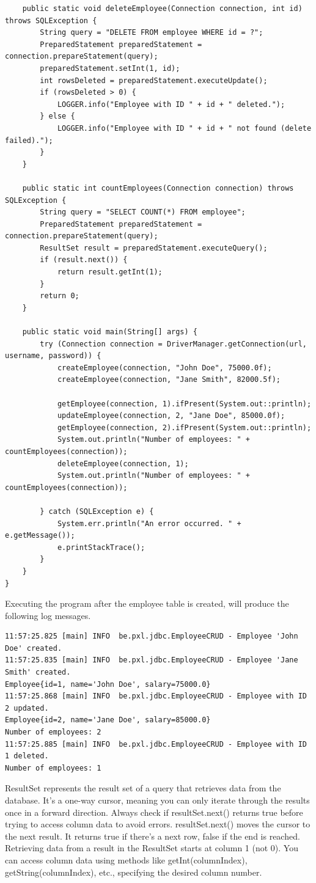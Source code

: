 \begin{lstlisting}
	public static void deleteEmployee(Connection connection, int id) throws SQLException {
		String query = "DELETE FROM employee WHERE id = ?";
		PreparedStatement preparedStatement = connection.prepareStatement(query);
		preparedStatement.setInt(1, id);
		int rowsDeleted = preparedStatement.executeUpdate();
		if (rowsDeleted > 0) {
			LOGGER.info("Employee with ID " + id + " deleted.");
		} else {
			LOGGER.info("Employee with ID " + id + " not found (delete failed).");
		}
	}

	public static int countEmployees(Connection connection) throws SQLException {
		String query = "SELECT COUNT(*) FROM employee";
		PreparedStatement preparedStatement = connection.prepareStatement(query);
		ResultSet result = preparedStatement.executeQuery();
		if (result.next()) {
			return result.getInt(1);
		}
		return 0;
	}

	public static void main(String[] args) {
		try (Connection connection = DriverManager.getConnection(url, username, password)) {
			createEmployee(connection, "John Doe", 75000.0f);
			createEmployee(connection, "Jane Smith", 82000.5f);

			getEmployee(connection, 1).ifPresent(System.out::println);
			updateEmployee(connection, 2, "Jane Doe", 85000.0f);
			getEmployee(connection, 2).ifPresent(System.out::println);
			System.out.println("Number of employees: " + countEmployees(connection));
			deleteEmployee(connection, 1);
			System.out.println("Number of employees: " + countEmployees(connection));

		} catch (SQLException e) {
			System.err.println("An error occurred. " + e.getMessage());
			e.printStackTrace();
		}
	}
}
\end{lstlisting}

Executing the program after the employee table is created, will produce the following log messages.

\begin{verbatim}
11:57:25.825 [main] INFO  be.pxl.jdbc.EmployeeCRUD - Employee 'John Doe' created.
11:57:25.835 [main] INFO  be.pxl.jdbc.EmployeeCRUD - Employee 'Jane Smith' created.
Employee{id=1, name='John Doe', salary=75000.0}
11:57:25.868 [main] INFO  be.pxl.jdbc.EmployeeCRUD - Employee with ID 2 updated.
Employee{id=2, name='Jane Doe', salary=85000.0}
Number of employees: 2
11:57:25.885 [main] INFO  be.pxl.jdbc.EmployeeCRUD - Employee with ID 1 deleted.
Number of employees: 1
\end{verbatim}


ResultSet represents the result set of a query that retrieves data from the database.
It's a one-way cursor, meaning you can only iterate through the results once in a forward direction.
Always check if resultSet.next() returns true before trying to access column data to avoid errors.
resultSet.next() moves the cursor to the next result. It returns true if there's a next row, false if the end is reached.
Retrieving data from a result in the ResultSet starts at column 1 (not 0). You can access column data using methods like getInt(columnIndex), getString(columnIndex), etc., specifying the desired column number.



